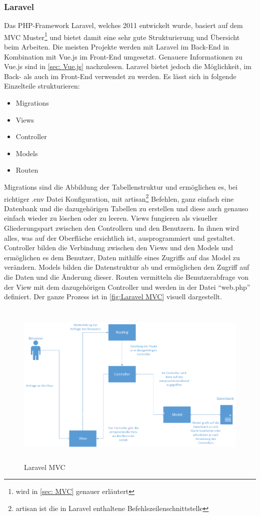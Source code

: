 \subsubsection{Laravel}
Das PHP-Framework Laravel, welches 2011 entwickelt wurde, basiert auf dem MVC Muster\footnote{wird in  \autoref{sec: MVC} genauer erläutert} und bietet damit eine sehr gute Strukturierung und Übersicht beim Arbeiten. Die meisten Projekte werden mit Laravel im Back-End in Kombination mit Vue.js im Front-End umgesetzt. Genauere Informationen zu Vue.js sind in \ref{sec: Vue.js} nachzulesen. Laravel bietet jedoch die Möglichkeit, im Back- als auch im Front-End verwendet zu werden. Es lässt sich in folgende Einzelteile strukturieren:

\begin{itemize}
	\item Migrations 
	\item Views
	\item Controller 
	\item Models
	\item Routen 
\end{itemize}

Migrations sind die Abbildung der Tabellenstruktur und ermöglichen es, bei richtiger .env Datei Konfiguration, mit artisan\footnote{artisan ist die in Laravel enthaltene Befehlszeilenschnittstelle} Befehlen, ganz einfach eine Datenbank und die dazugehörigen Tabellen zu erstellen und diese auch genauso einfach wieder zu löschen oder zu leeren. Views fungieren als visueller Gliederungspart zwischen den Controllern und den Benutzern. In ihnen wird alles, was auf der Oberfläche ersichtlich ist, ausprogrammiert und gestaltet. Controller bilden die Verbindung zwischen den Views und den Models und ermöglichen es dem Benutzer, Daten mithilfe eines Zugriffs auf das Model zu verändern. Models bilden die Datenstruktur ab und ermöglichen den Zugriff auf die Daten und die Änderung dieser. Routen vermitteln die Benutzerabfrage von der View mit dem dazugehörigen Controller und werden in der Datei “web.php” definiert. Der ganze Prozess ist in \autoref{fig:Laravel MVC} visuell dargestellt. 
\begin{figure}[h]
	\centering
	\includegraphics[height=8cm,width=15cm]{images/LaravelMVC}
	\caption{Laravel MVC}
	\label{fig:Laravel MVC}
\end{figure}
\newpage




